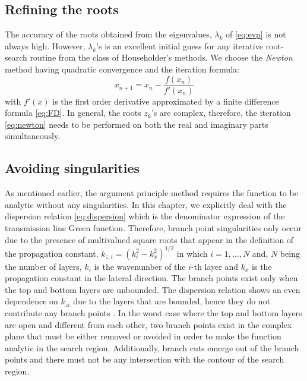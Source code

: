 \subsection{Refining the roots}
%
The accuracy of the roots obtained from the eigenvalues, $\lambda_k$ of \eqref{eq:evp} is not always high. However, $\lambda_k$'s is an excellent initial guess for any iterative root-search routine from the class of Householder's methods. We choose the \emph{Newton} method \cite{Press2007} having quadratic convergence and the iteration formula:
%
\begin{equation}
  x_{n+1} = x_n - \frac {f(x_n)}{f'(x_n)}
  \label{eq:newton}
\end{equation}
%
with $f'(x)$ is the first order derivative approximated by a finite difference formula \eqref{eq:FD}. In general, the roots $z_k$'s are complex, therefore, the iteration \eqref{eq:newton} needs to be performed on both the real and imaginary parts simultaneously.
\subsection{Avoiding singularities}
%
As mentioned earlier, the argument principle method requires the function to be analytic without any singularities. In this chapter, we explicitly deal with the dispersion relation \eqref{eq:dispersion} which is the denominator expression of the transmission line Green function. Therefore, branch point singularities only occur due to the presence of multivalued square roots that appear in the definition of the propagation constant, $k_{z,i} = (k_i^2 - k_x^2)^{1/2}$ in which $i =1,\dots, N$ and, $N$ being the number of layers, $k_i$ is the wavenumber of the $i$-th layer and $k_x$ is the propagation constant in the lateral direction. The branch points exist only when the top and bottom layers are unbounded. The dispersion relation shows an even dependence on $k_{zi}$ due to the layers that are bounded, hence they do not  contribute any branch points \cite[Section~5.3a]{Felsen1994}. In the worst case where the top and bottom layers are open and different from each other, two branch points exist in the complex plane that must be either removed or avoided in order to make the function analytic in the search region. Additionally, branch cuts emerge out of the branch points and there must not be any intersection with the contour of the search region.

